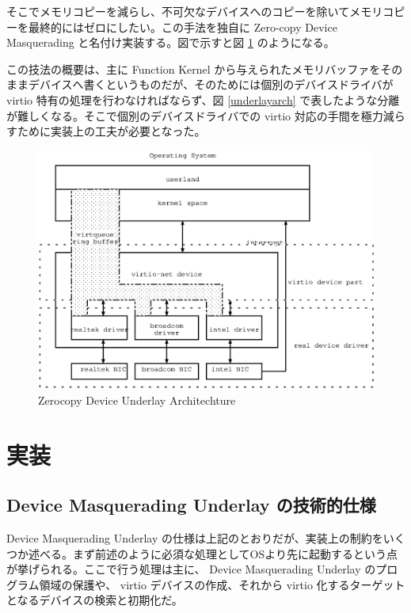 \documentclass[a4paper,11pt,report]{ltjsbook}
\begin{document}
そこでメモリコピーを減らし、不可欠なデバイスへのコピーを除いてメモリコピーを最終的にはゼロにしたい。この手法を独自に Zero-copy Device Masquerading と名付け実装する。図で示すと図 \ref{underlayzerocpy} のようになる。

この技法の概要は、主に Function Kernel から与えられたメモリバッファをそのままデバイスへ書くというものだが、そのためには個別のデバイスドライバが virtio 特有の処理を行わなければならず、図 \ref{underlayarch} で表したような分離が難しくなる。そこで個別のデバイスドライバでの virtio 対応の手間を極力減らすために実装上の工夫が必要となった。

\begin{figure}[htbp]
  \begin{center}
    \includegraphics[width=.7\textwidth]{./underlayzerocpy.eps}
    \caption{Zerocopy Device Underlay Architechture}
    \label{underlayzerocpy}
  \end{center}
\end{figure}



\chapter{実装}

\section{Device Masquerading Underlay の技術的仕様}

Device Masquerading Underlay の仕様は上記のとおりだが、実装上の制約をいくつか述べる。まず前述のように必須な処理としてOSより先に起動するという点が挙げられる。ここで行う処理は主に、 Device Masquerading Underlay のプログラム領域の保護や、 virtio デバイスの作成、それから virtio 化するターゲットとなるデバイスの検索と初期化だ。
\end{document}
